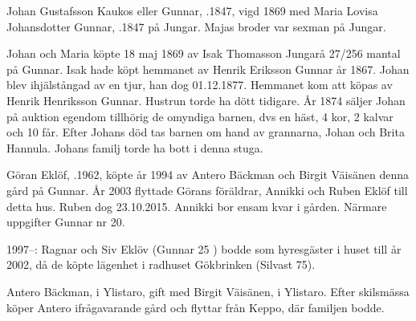 %
Johan Gustafsson Kaukos eller Gunnar, .1847, vigd 1869 med Maria Lovisa Johansdotter Gunnar, .1847 på Jungar. Majas broder var sexman på Jungar.
\begin{jhchildren}
  \item {}
  \item {}
  \item {}
\end{jhchildren}

Johan och Maria köpte 18 maj 1869 av Isak Thomasson Jungarå 27/256 mantal på Gunnar. Isak hade köpt hemmanet av Henrik Eriksson Gunnar år 1867. Johan blev ihjälstångad av en tjur, han dog 01.12.1877. Hemmanet kom att köpas av Henrik Henriksson Gunnar. Hustrun torde ha dött tidigare. År 1874 säljer Johan på auktion egendom tillhörig de omyndiga barnen, dvs en häst, 4 kor, 2 kalvar och 10 får. Efter Johans död tas barnen om hand av grannarna, Johan och Brita Hannula. Johans familj torde ha bott i denna stuga.



%



%
Göran Eklöf, .1962, köpte år 1994 av Antero Bäckman  och Birgit Väisänen denna gård på Gunnar. År 2003 flyttade Görans föräldrar, Annikki och Ruben Eklöf till detta hus. Ruben dog 23.10.2015. Annikki bor ensam kvar i gården. Närmare uppgifter Gunnar nr 20.

1997--: Ragnar och Siv Eklöv (Gunnar 25 ) bodde som hyresgäster i huset till år 2002, då de köpte lägenhet i radhuset Gökbrinken (Silvast 75).


%
Antero Bäckman,  i Ylistaro, gift med Birgit Väisänen,  i Ylistaro. Efter skilsmässa köper Antero ifrågavarande gård och flyttar från Keppo, där familjen bodde.
\begin{jhchildren}
  \item {}
  \item {}
\end{jhchildren}


